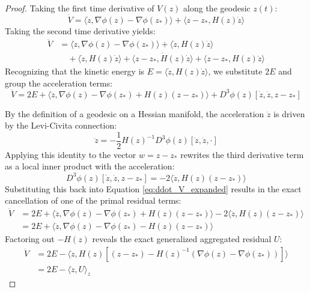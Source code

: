 \documentclass[11pt]{article}
\begin{document}
\begin{proof}
Taking the first time derivative of $V(z)$ along the geodesic $z(t)$:
\begin{equation}
    \dot{V} = \langle \dot{z}, \nabla \phi(z) - \nabla \phi(z_*) \rangle + \langle z - z_*, H(z)\dot{z} \rangle
\end{equation}
Taking the second time derivative yields:
\begin{align}
    \ddot{V} &= \langle \ddot{z}, \nabla \phi(z) - \nabla \phi(z_*) \rangle + \langle \dot{z}, H(z)\dot{z} \rangle \nonumber \\
             &\quad + \langle \dot{z}, H(z)\dot{z} \rangle + \langle z - z_*, \dot{H}(z)\dot{z} \rangle + \langle z - z_*, H(z)\ddot{z} \rangle
\end{align}
Recognizing that the kinetic energy is $E = \langle \dot{z}, H(z)\dot{z} \rangle$, we substitute $2E$ and group the acceleration terms:
\begin{equation} \label{eq:ddot_V_expanded}
    \ddot{V} = 2E + \langle \ddot{z}, \nabla \phi(z) - \nabla \phi(z_*) + H(z)(z - z_*) \rangle + D^3\phi(z)[\dot{z}, \dot{z}, z - z_*]
\end{equation}

By the definition of a geodesic on a Hessian manifold, the acceleration $\ddot{z}$ is driven by the Levi-Civita connection:
\begin{equation}
    \ddot{z} = -\frac{1}{2} H(z)^{-1} D^3\phi(z)[\dot{z}, \dot{z}, \cdot]
\end{equation}
Applying this identity to the vector $w = z - z_*$ rewrites the third derivative term as a local inner product with the acceleration:
\begin{equation}
    D^3\phi(z)[\dot{z}, \dot{z}, z - z_*] = -2 \langle \ddot{z}, H(z)(z - z_*) \rangle
\end{equation}
Substituting this back into Equation \ref{eq:ddot_V_expanded} results in the exact cancellation of one of the primal residual terms:
\begin{align}
    \ddot{V} &= 2E + \langle \ddot{z}, \nabla \phi(z) - \nabla \phi(z_*) + H(z)(z - z_*) \rangle - 2 \langle \ddot{z}, H(z)(z - z_*) \rangle \nonumber \\
             &= 2E + \langle \ddot{z}, \nabla \phi(z) - \nabla \phi(z_*) - H(z)(z - z_*) \rangle
\end{align}
Factoring out $-H(z)$ reveals the exact generalized aggregated residual $U$:
\begin{align}
    \ddot{V} &= 2E - \langle \ddot{z}, H(z) \left[ (z - z_*) - H(z)^{-1}(\nabla \phi(z) - \nabla \phi(z_*)) \right] \rangle \nonumber \\
             &= 2E - \langle \ddot{z}, U \rangle_z
\end{align}
\end{proof}
\end{document}
